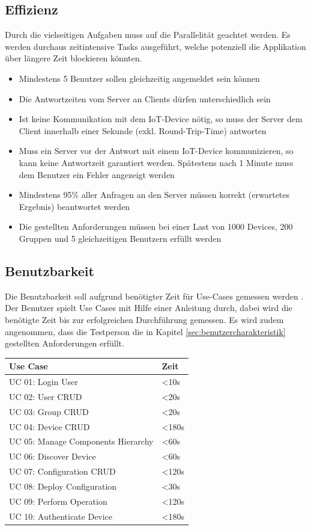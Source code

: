 \subsection{Effizienz}
Durch die vielseitigen Aufgaben muss auf die Parallelität geachtet werden. Es werden durchaus zeitintensive Tasks ausgeführt, welche potenziell die Applikation über längere Zeit blockieren könnten.

\begin{itemize}
\item Mindestens 5 Benutzer sollen gleichzeitig angemeldet sein können
\item Die Antwortzeiten vom Server an Clients dürfen unterschiedlich sein  
\item Ist keine Kommunikation mit dem IoT-Device nötig, so muss der Server dem Client innerhalb einer Sekunde (exkl. Round-Trip-Time) antworten
\item Muss ein Server vor der Antwort mit einem IoT-Device kommunizieren, so kann keine Antwortzeit garantiert werden. Spätestens nach 1 Minute muss dem Benutzer ein Fehler angezeigt werden
\item Mindestens 95\% aller Anfragen an den Server müssen korrekt (erwartetes Ergebnis) beantwortet werden
\item Die gestellten Anforderungen müssen bei einer Last von 1000 Devices, 200 Gruppen und 5 gleichzeitigen Benutzern erfüllt werden
\end{itemize}
\newpage

\subsection{Benutzbarkeit}
Die Benutzbarkeit soll aufgrund benötigter Zeit für Use-Cases gemessen werden \cite{ReinhardSteiner}. Der Benutzer spielt Use Cases mit Hilfe einer Anleitung durch, dabei wird die benötigte Zeit bis zur erfolgreichen Durchführung gemessen. Es wird zudem angenommen, dass die Testperson die in Kapitel \ref{sec:benutzercharakteristik} gestellten Anforderungen erfüllt.

\begin{center}
\begin{longtable}{| p{8cm} | p{2.5cm} |}
\hline
\textbf{Use Case} 						& \textbf{Zeit}\\ \hline
UC 01: Login User    					& <10s \\ \hline
UC 02: User CRUD			 			& <20s \\ \hline
UC 03: Group CRUD	         			& <20s \\ \hline 
UC 04: Device CRUD               		& <180s \\ \hline 
UC 05: Manage Components Hierarchy		& <60s \\ \hline 
UC 06: Discover Device     				& <60s \\ \hline
UC 07: Configuration CRUD			 	& <120s \\ \hline
UC 08: Deploy Configuration				& <30s \\ \hline
UC 09: Perform Operation			 	& <120s \\ \hline
UC 10: Authenticate Device	 			& <180s \\ \hline
\end{longtable}
\end{center}
